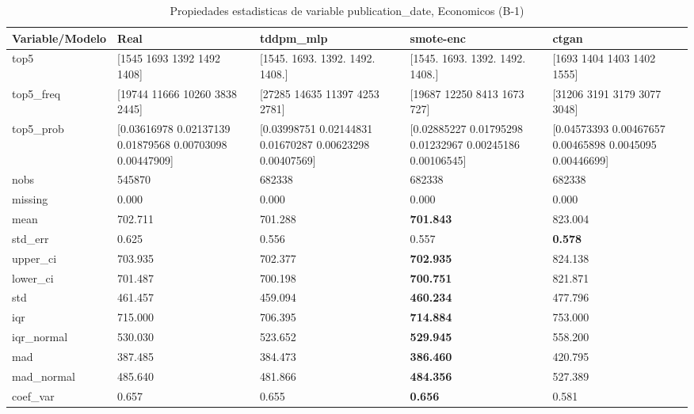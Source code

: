 \begin{table}[H]
\centering
\fontsize{8}{14}\selectfont
\caption{Propiedades  estadisticas de variable publication\_date, Economicos (B-1)}
\label{table-stats-economicos-b-1-publication_date}
\begin{tabular}{|l|m{10em}|m{10em}|m{10em}|m{10em}|}
\hline
 \rowcolor[gray]{0.8}
Variable/Modelo & Real & tddpm\_mlp & smote-enc & ctgan \\
\hline top5 & [1545 1693 1392 1492 1408] & [1545. 1693. 1392. 1492. 1408.] & [1545. 1693. 1392. 1492. 1408.] & [1693 1404 1403 1402 1555] \\
\hline top5\_freq & [19744 11666 10260  3838  2445] & [27285 14635 11397  4253  2781] & [19687 12250  8413  1673   727] & [31206  3191  3179  3077  3048] \\
\hline top5\_prob & [0.03616978 0.02137139 0.01879568 0.00703098 0.00447909] & [0.03998751 0.02144831 0.01670287 0.00623298 0.00407569] & [0.02885227 0.01795298 0.01232967 0.00245186 0.00106545] & [0.04573393 0.00467657 0.00465898 0.0045095  0.00446699] \\
\hline nobs & 545870 & 682338 & 682338 & 682338 \\
\hline missing & 0.000 & 0.000 & 0.000 & 0.000 \\
\hline mean & 702.711 & 701.288 & \bfseries 701.843 & \cellcolor[rgb]{0.9, 0.54, 0.52} 823.004 \\
\hline std\_err & 0.625 & \cellcolor[rgb]{0.9, 0.54, 0.52} 0.556 & 0.557 & \bfseries 0.578 \\
\hline upper\_ci & 703.935 & 702.377 & \bfseries 702.935 & \cellcolor[rgb]{0.9, 0.54, 0.52} 824.138 \\
\hline lower\_ci & 701.487 & 700.198 & \bfseries 700.751 & \cellcolor[rgb]{0.9, 0.54, 0.52} 821.871 \\
\hline std & 461.457 & 459.094 & \bfseries 460.234 & \cellcolor[rgb]{0.9, 0.54, 0.52} 477.796 \\
\hline iqr & 715.000 & 706.395 & \bfseries 714.884 & \cellcolor[rgb]{0.9, 0.54, 0.52} 753.000 \\
\hline iqr\_normal & 530.030 & 523.652 & \bfseries 529.945 & \cellcolor[rgb]{0.9, 0.54, 0.52} 558.200 \\
\hline mad & 387.485 & 384.473 & \bfseries 386.460 & \cellcolor[rgb]{0.9, 0.54, 0.52} 420.795 \\
\hline mad\_normal & 485.640 & 481.866 & \bfseries 484.356 & \cellcolor[rgb]{0.9, 0.54, 0.52} 527.389 \\
\hline coef\_var & 0.657 & 0.655 & \bfseries 0.656 & \cellcolor[rgb]{0.9, 0.54, 0.52} 0.581 \\

\end{tabular}
\end{table}
